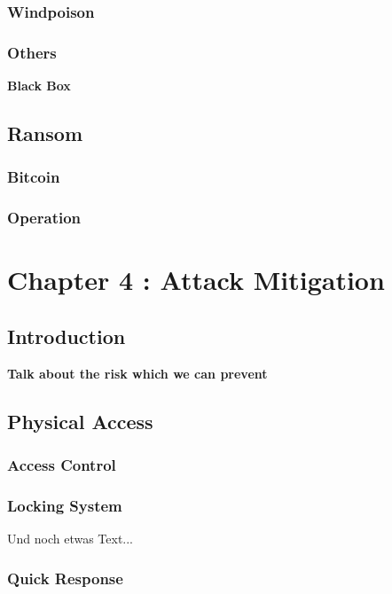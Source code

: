 \documentclass[twosided,a4,10pt]{article}
\begin{document}
\begin{multicols}{2}
 \subsubsection{Windpoison}
 \lipsum[1]
 \subsubsection{Others}
 \textbf{Black Box}
 \lipsum[1]
 
\subsection{Ransom}
 \subsubsection{Bitcoin}
 \lipsum[1]
 \subsubsection{Operation}
 \lipsum[1]



\section{Chapter 4 : Attack Mitigation }

\subsection{Introduction}
 \textbf{Talk about the risk which we can prevent}
 \lipsum[1]



\subsection{Physical Access}
 \subsubsection{Access Control}
 \lipsum[1]

 \subsubsection{Locking System}
 Und noch etwas Text... \cite{muster} \newline
 \lipsum[1]
 \subsubsection{Quick Response}
 \lipsum[1]


\end{multicols}
\end{document}
